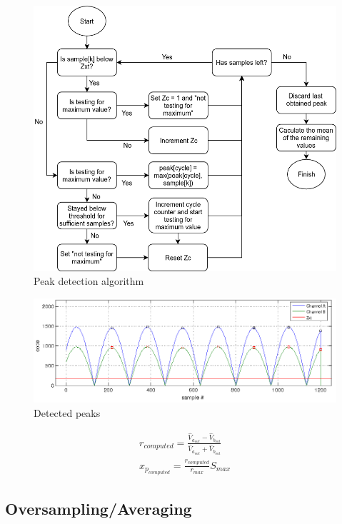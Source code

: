 \documentclass[conference]{IEEEtran}
\begin{document}
\begin{figure}[h!]
\centering
\includegraphics[scale=0.22]{pics/demodalg/peak_detection.png}
\caption{Peak detection algorithm}
\label{fig:peakdet0}
\end{figure}

\begin{figure}[h!]
\centering
\includegraphics[scale=0.3]{pics/demodalg/detected_peaks.png}
\caption{Detected peaks}
\label{fig:det_peaks_uhul}
\end{figure}

\begin{equation}
\begin{gathered}
r_{computed} = \frac{\hat{V}_{a_{out}} - \hat{V}_{b_{out}}}{\hat{V}_{a_{out}} + \hat{V}_{b_{out}}} \\
x_{p_{computed}} = \frac{r_{computed}}{r_{max}} S_{max}
\end{gathered}
\label{eq:real_pos_calc}
\end{equation}

\subsection{Oversampling/Averaging}
\end{document}
